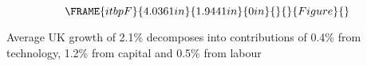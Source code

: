 \documentclass[notes=show]{beamer}
\begin{document}
\begin{frame}%


\begin{equation*}
\FRAME{itbpF}{4.0361in}{1.9441in}{0in}{}{}{Figure}{\special{language
"Scientific Word";type "GRAPHIC";maintain-aspect-ratio TRUE;display
"USEDEF";valid_file "T";width 4.0361in;height 1.9441in;depth
0in;original-width 13.3614in;original-height 6.3892in;cropleft "0";croptop
"1";cropright "1";cropbottom "0";tempfilename
'PEZYHY0I.bmp';tempfile-properties "XPR";}}
\end{equation*}

\begin{center}
Average UK growth of 2.1\% decomposes into contributions of 0.4\% from
technology, 1.2\% from capital and 0.5\% from labour
\end{center}

\transboxout%
\end{frame}%
\end{document}
